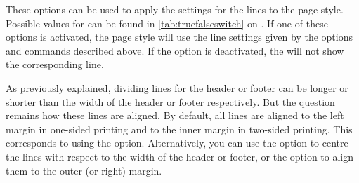 \begin{Declaration}
\end{Declaration}
These options can be used to apply the settings for the lines to the
 page style. Possible values for  can be
found in \autoref{tab:truefalseswitch} on
. If one of these options is activated, the
 page style will use the line settings given by the options
and commands described above. If the option is deactivated, the
 will not show the corresponding line.%
\EndIndexGroup


\begin{Declaration}
\end{Declaration}
As previously explained, dividing lines for the header or footer can be longer
or shorter than the width of the header or footer respectively. But the
question remains how these lines are aligned. By default, all lines are
aligned to the left margin in one-sided printing and to the inner margin in
two-sided printing. This corresponds to using the  option.
Alternatively, you can use the  option to centre the lines with
respect to the width of the header or footer, or the  option to
align them to the outer (or right) margin.%
\EndIndexGroup
%
\EndIndexGroup

